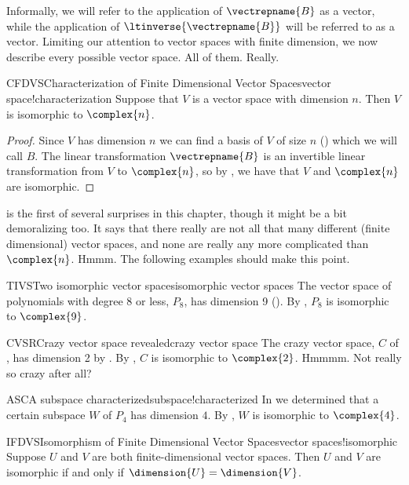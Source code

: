%
Informally, we will refer to the application of $\vectrepname{B}$ as  a vector, while the application of $\ltinverse{\vectrepname{B}}$ will be referred to as  a vector.
%
%
Limiting our attention to vector spaces with finite dimension, we now describe every possible vector space.  All of them.  Really.
%
\begin{theorem}{CFDVS}{Characterization of Finite Dimensional Vector Spaces}{vector space!characterization}
Suppose that $V$ is a vector space with dimension $n$.  Then $V$ is isomorphic to $\complex{n}$.
\end{theorem}
%
\begin{proof}
%
Since $V$ has dimension $n$ we can find a basis of $V$ of size $n$ () which we will call $B$.  The linear transformation $\vectrepname{B}$ is an invertible linear transformation from $V$ to $\complex{n}$, so by , we have that $V$ and $\complex{n}$ are isomorphic.
%
\end{proof}
%
 is the first of several surprises in this chapter, though it might be a bit demoralizing too.  It says that there really are not all that many different (finite dimensional) vector spaces, and none are really any more complicated than $\complex{n}$.  Hmmm.  The following examples should make this point.
%
\begin{example}{TIVS}{Two isomorphic vector spaces}{isomorphic vector spaces}
The vector space of polynomials with degree 8 or less, $P_8$, has dimension 9 ().  By , $P_8$ is isomorphic to $\complex{9}$.
%
\end{example}
%
\begin{example}{CVSR}{Crazy vector space revealed}{crazy vector space}
The crazy vector space, $C$ of , has dimension 2 by .  By , $C$ is isomorphic to $\complex{2}$.  Hmmmm.  Not really so crazy after all?
%
\end{example}
%
%
\begin{example}{ASC}{A subspace characterized}{subspace!characterized}
In  we determined that a certain subspace $W$ of $P_4$ has dimension $4$.  By , $W$ is isomorphic to $\complex{4}$.
%
\end{example}
%
\begin{theorem}{IFDVS}{Isomorphism of Finite Dimensional Vector Spaces}{vector spaces!isomorphic}
Suppose $U$ and $V$ are both finite-dimensional vector spaces.  Then $U$ and $V$ are isomorphic if and only if $\dimension{U}=\dimension{V}$.
\end{theorem}
